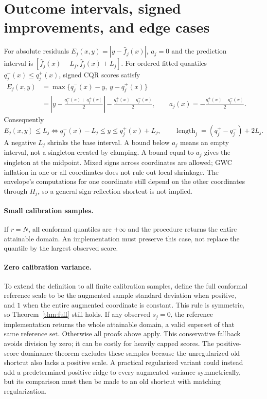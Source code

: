 \documentclass[11pt]{article}
\begin{document}
\section{Outcome intervals, signed improvements, and edge cases}\label{sec:edges}
For absolute residuals $E_j(x,y)=|y-\hat f_j(x)|$, $a_j=0$ and the prediction
interval is $[\hat f_j(x)-L_j,\hat f_j(x)+L_j]$.
For ordered fitted quantiles $q^-_j(x)\le q^+_j(x)$, signed CQR scores satisfy
\begin{align*}
 E_j(x,y)&=\max\{q^-_j(x)-y,\ y-q^+_j(x)\}\\
 &=\left|y-\frac{q^-_j(x)+q^+_j(x)}2\right|
                  -\frac{q^+_j(x)-q^-_j(x)}2,
 \qquad a_j(x)=-\frac{q^+_j(x)-q^-_j(x)}2.
\end{align*}
Consequently
\[
 E_j(x,y)\le L_j
 \Longleftrightarrow
 q^-_j(x)-L_j\le y\le q^+_j(x)+L_j,
 \qquad \operatorname{length}_j=(q^+_j-q^-_j)+2L_j.
\]
A negative $L_j$ shrinks the base interval. A bound below $a_j$ means an empty
interval, not a singleton created by clamping. A bound equal to $a_j$ gives
the singleton at the midpoint. Mixed signs across coordinates are allowed;
GWC inflation in one or all coordinates does not rule out local shrinkage.
The envelope's computations for one coordinate still depend on the other
coordinates through $H_j$, so a general sign-reflection shortcut is not implied.

\paragraph{Small calibration samples.}
If $r=N$, all conformal quantiles are $+\infty$ and the procedure returns the
entire attainable domain. An implementation must preserve this case, not
replace the quantile by the largest observed score.

\paragraph{Zero calibration variance.}
To extend the definition to all finite calibration samples, define the full
conformal reference scale to be the augmented sample standard deviation when
positive, and $1$ when the entire augmented coordinate is constant. This rule
is symmetric, so Theorem~\ref{thm:full} still holds. If any observed $s_j=0$,
the reference implementation returns the whole attainable domain, a valid
superset of that same reference set. Otherwise all proofs above apply.
This conservative fallback avoids division by zero; it can be costly for
heavily capped scores. The positive-score dominance theorem excludes these
samples because the unregularized old shortcut also lacks a positive scale.
A practical regularized variant could instead add a predetermined positive
ridge to every augmented variance symmetrically, but its comparison must then
be made to an old shortcut with matching regularization.
\end{document}
